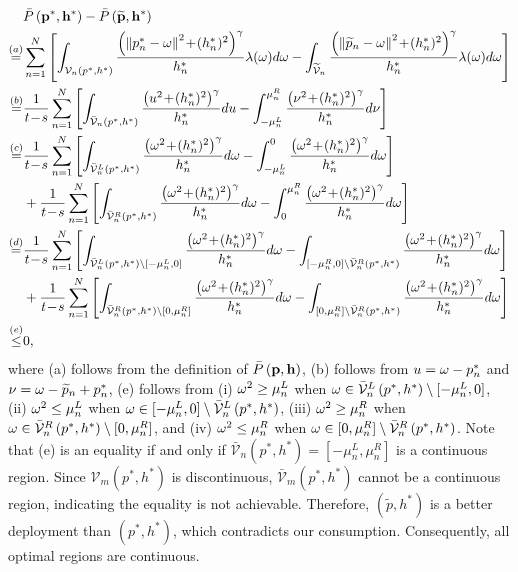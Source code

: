 \documentclass[smallabstract,smallcaptions]{dccpaper}
\newcommand{\df}{\ensuremath{\lam}}         %
\newcommand{\bP}{\ensuremath{\vp}}          %
\newcommand{\abPo}{\ensuremath{\bar{P}}}  %
\newcommand{\bH}{\ensuremath{\vh}}          %
\newcommand{\Vor}{\ensuremath{\mathcal{V}}}         %
\begin{document}
\begin{equation}
\begin{aligned}
    &\abPo\left(\bP^*,\bH^*\right) - \abPo\left(\widetilde{\bP},\bH^*\right)\\
    \overset{(a)}{=}&\sum_{n=1}^{N}\left[\int_{\Vor_n\left(p^*, h^*\right)}  \frac{ \left(\Norm{p^*_n- \ome}^2 \!+\!(h^*_n)^2\right)^{\gam}}{h^*_n} \df(\ome)d\ome-\int_{\widetilde{\Vor}_{n}} \frac{ \left(\Norm{\widetilde{p}_n- \ome}^2 \!+\!(h^*_n)^2\right)^{\gam}}{h^*_n} \df(\ome)d\ome\right]\\
    \overset{(b)}{=}&\frac{1}{t\!-\!s}\sum_{n=1}^{N}\left[\int_{\bar{\Vor}_n\left(p^*, h^*\right)}  \frac{ \left(u^2 \!+\!(h^*_n)^2\right)^{\gam}}{h^*_n} du-\int_{-\mu^L_n}^{\mu^R_n} \frac{ \left(\nu^2 \!+\!(h^*_n)^2\right)^{\gam}}{h^*_n} d\nu\right]\\
    \overset{(c)}{=}&\frac{1}{t\!-\!s}\sum_{n=1}^{N}\left[\int_{\bar{\Vor}^L_n\left(p^*, h^*\right)}  \frac{ \left(\ome^2 \!+\!(h^*_n)^2\right)^{\gam}}{h^*_n} d\ome-\int_{-\mu^L_n}^{0} \frac{ \left(\ome^2 \!+\!(h^*_n)^2\right)^{\gam}}{h^*_n} d\ome\right]\\
    &+\frac{1}{t\!-\!s}\sum_{n=1}^{N}\left[\int_{\bar{\Vor}^R_n\left(p^*, h^*\right)}  \frac{ \left(\ome^2 \!+\!(h^*_n)^2\right)^{\gam}}{h^*_n} d\ome-\int_{0}^{\mu^R_n} \frac{ \left(\ome^2 \!+\!(h^*_n)^2\right)^{\gam}}{h^*_n} d\ome\right]\\
    \overset{(d)}{=}&\frac{1}{t\!-\!s}\sum_{n=1}^{N}\left[\int_{\bar{\Vor}^L_n\left(p^*, h^*\right)\setminus[-\mu^L_n, 0]}  \frac{ \left(\ome^2 \!+\!(h^*_n)^2\right)^{\gam}}{h^*_n} d\ome-\int_{[ -\mu^R_n,0]\setminus\bar{\Vor}^R_n\left(p^*, h^*\right)} \frac{ \left(\ome^2 \!+\!(h^*_n)^2\right)^{\gam}}{h^*_n} d\ome\right]\\
    &+\frac{1}{t\!-\!s}\sum_{n=1}^{N}\left[\int_{\bar{\Vor}^R_n\left(p^*, h^*\right)\setminus[0, \mu^R_n]}  \frac{ \left(\ome^2 \!+\!(h^*_n)^2\right)^{\gam}}{h^*_n} d\ome-\int_{[0, \mu^R_n]\setminus\bar{\Vor}^R_n\left(p^*, h^*\right)} \frac{ \left(\ome^2 \!+\!(h^*_n)^2\right)^{\gam}}{h^*_n} d\ome\right]\\
    \overset{(e)}{\le}&0,
\end{aligned}
\end{equation}
where (a) follows from the definition of $\abPo\left(\bP,\bH\right)$, (b) follows from $u=\omega-p^*_n$ and $\nu=\omega-\widetilde{p}_n+p^*_n$, (e) follows from (i) $\omega^2\ge\mu^L_n$ when $\ome\in\bar{\Vor}^L_n\left(p^*, h^*\right)\setminus[-\mu^L_n, 0]$, (ii)  $\omega^2\le\mu^L_n$ when $\ome\in[-\mu^L_n, 0]\setminus\bar{\Vor}^L_n\left(p^*, h^*\right)$, (iii) $\omega^2\ge\mu^R_n$ when $\ome\in\bar{\Vor}^R_n\left(p^*, h^*\right)\setminus[0, \mu^R_n]$, and (iv) $\omega^2\le\mu^R_n$ when $\ome\in[0, \mu^R_n]\setminus\bar{\Vor}^R_n\left(p^*, h^*\right)$.
Note that (e) is an equality if and only if $\bar{\Vor}_n\left(p^*, h^*\right)=[-\mu^L_n,\mu^R_n]$ is a continuous region.
Since $\Vor_m\left(p^*, h^*\right)$ is discontinuous, $\bar{\Vor}_m\left(p^*, h^*\right)$ cannot be a continuous region, indicating the equality is not achievable.
Therefore, $(\widetilde{p}, h^*)$ is a better deployment than $(p^*, h^*)$, which contradicts our consumption.
Consequently, all optimal regions are continuous.
\end{document}

